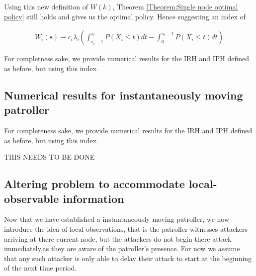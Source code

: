 \documentclass[a4paper,10pt]{article}
\theoremstyle{definition}
\theoremstyle{definition}
\theoremstyle{remark}
\theoremstyle{definition}
\begin{document}
Using this new definition of $W(k)$, Theorem \ref{Theorem:Single node optimal policy} still holds and gives us the optimal policy. Hence suggesting an index of

\begin{align*}
W_{i}(\bm{s}) \equiv c_{i} \lambda_{i} \left( \int_{s_{i}-1}^{s_{i}} P(X_{i} \leq t) dt - \int_{0}^{s_{i}-1} P(X_{i} \leq t) dt \right)
\end{align*}

For completness sake, we provide numerical results for the IRH and IPH defined as before, but using this index.

\subsection{Numerical results for instantaneously moving patroller}
For completeness sake, we provide numerical results for the IRH and IPH defined as before, but using this index.


\begin{huge}
THIS NEEDS TO BE DONE
\end{huge}



\subsection{Altering problem to accommodate local-observable information}
Now that we have established a instantaneously moving patroller, we now introduce the idea of local-observations, that is the patroller witnesses attackers arriving at there current node, but the attackers do not begin there attack immediately,as they are aware of the patroller's presence. For now we assume that any such attacker is only able to delay their attack to start at the beginning of the next time period.
\end{document}
